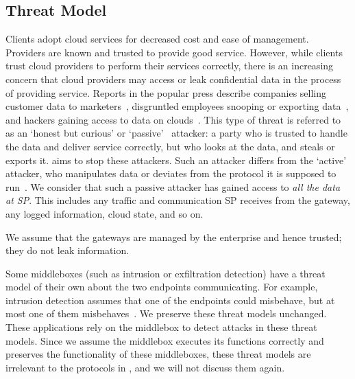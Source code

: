 \subsection{Threat Model}
  Clients adopt cloud services for decreased cost and ease of management. Providers are known and trusted to provide good service. 
  However, while clients trust cloud providers to perform their services correctly, there is an increasing concern that cloud providers may access or leak confidential data in the process of providing service.
  Reports in the popular press describe companies selling customer data to marketers~\cite{radioshack}, disgruntled employees snooping or exporting data~\cite{att}, and hackers gaining access to data on clouds~\cite{databreach,PrivacyRecords}.
  This type of threat is referred to as an `honest but curious' or `passive'~\cite{goodrich} attacker: a party who is trusted to handle the data and deliver service correctly, but who looks at the data, and steals or exports it.  \sys aims to stop these attackers.
  Such an attacker differs from the `active' attacker, who manipulates data or deviates from the protocol it is supposed to run~\cite{goodrich}.
%
We consider that such a passive attacker has gained access 
to {\em all the data at SP}.
This includes any traffic and communication SP receives from the 
gateway, any logged information, cloud state, and so on.  
 
We assume that the gateways are managed by the enterprise and hence trusted; they do not leak information.


Some middleboxes (such as intrusion or exfiltration detection) have a threat model
of their own about the two endpoints communicating. For example, intrusion detection assumes that 
one of the endpoints could misbehave, but at most one of them misbehaves~\cite{bro}.  
We preserve these threat models unchanged. These applications rely
on the middlebox to detect attacks in these threat models. Since we assume the middlebox executes
its functions correctly and \sys preserves the functionality of these middleboxes, 
these threat models are irrelevant to the protocols in \sys, and we will not discuss them again. 

